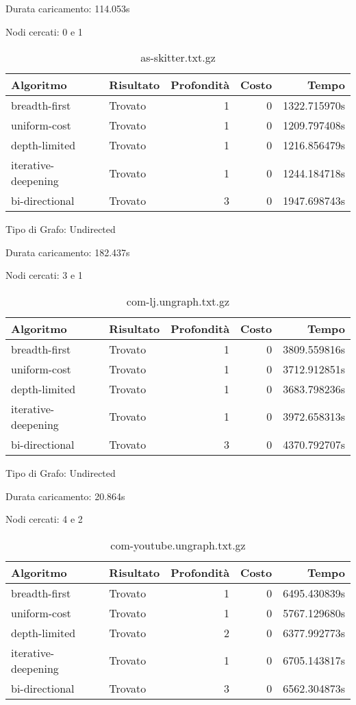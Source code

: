 Durata caricamento: 114.053s

Nodi cercati: 0 e 1

\begin{table}[h]
\centering
\begin{tabular}{|l|l|r|r|r|}
\hline
\textbf{Algoritmo} & \textbf{Risultato} & \textbf{Profondità} & \textbf{Costo} & \textbf{Tempo} \\
 \hline
breadth-first & Trovato & 1 & 0 & 1322.715970s \\
uniform-cost & Trovato & 1 & 0 & 1209.797408s \\
depth-limited & Trovato & 1 & 0 & 1216.856479s \\
iterative-deepening & Trovato & 1 & 0 & 1244.184718s \\
bi-directional & Trovato & 3 & 0 & 1947.698743s \\
\hline
\end{tabular}
\caption{as-skitter.txt.gz}
\end{table}
Tipo di Grafo: Undirected

Durata caricamento: 182.437s

Nodi cercati: 3 e 1

\begin{table}[h]
\centering
\begin{tabular}{|l|l|r|r|r|}
\hline
\textbf{Algoritmo} & \textbf{Risultato} & \textbf{Profondità} & \textbf{Costo} & \textbf{Tempo} \\
 \hline
breadth-first & Trovato & 1 & 0 & 3809.559816s \\
uniform-cost & Trovato & 1 & 0 & 3712.912851s \\
depth-limited & Trovato & 1 & 0 & 3683.798236s \\
iterative-deepening & Trovato & 1 & 0 & 3972.658313s \\
bi-directional & Trovato & 3 & 0 & 4370.792707s \\
\hline
\end{tabular}
\caption{com-lj.ungraph.txt.gz}
\end{table}
Tipo di Grafo: Undirected

Durata caricamento: 20.864s

Nodi cercati: 4 e 2

\begin{table}[h]
\centering
\begin{tabular}{|l|l|r|r|r|}
\hline
\textbf{Algoritmo} & \textbf{Risultato} & \textbf{Profondità} & \textbf{Costo} & \textbf{Tempo} \\
 \hline
breadth-first & Trovato & 1 & 0 & 6495.430839s \\
uniform-cost & Trovato & 1 & 0 & 5767.129680s \\
depth-limited & Trovato & 2 & 0 & 6377.992773s \\
iterative-deepening & Trovato & 1 & 0 & 6705.143817s \\
bi-directional & Trovato & 3 & 0 & 6562.304873s \\
\hline
\end{tabular}
\caption{com-youtube.ungraph.txt.gz}
\end{table}

